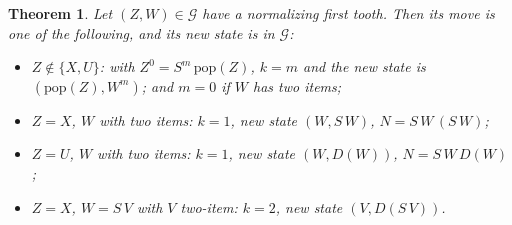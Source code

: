 \documentclass[11pt]{amsart}
\newtheorem{theorem}{Theorem}
\theoremstyle{definition}
\newcommand{\pop}{\mathrm{pop}}
\newcommand{\Gc}{\mathcal G}
\begin{document}
\begin{theorem}\label{thm:closure}
Let $(Z,W)\in\Gc$ have a normalizing first tooth. Then its move is one of the following, and its
new state is in $\Gc$:
\begin{itemize}
\item[(i)] $Z\notin\{X,U\}$: with $Z^0=S^m\,\pop(Z)$, $k=m$ and the new state is
  $(\pop(Z),W^m)$; and $m=0$ if $W$ has two items;
\item[(ii)] $Z=X$, $W$ with two items: $k=1$, new state $(W,S\,W)$, $N=S\,W\,(S\,W)$;
\item[(iii)] $Z=U$, $W$ with two items: $k=1$, new state $(W,D(W))$, $N=S\,W\,D(W)$;
\item[(iv)] $Z=X$, $W=S\,V$ with $V$ two-item: $k=2$, new state $(V,D(S\,V))$.
\end{itemize}
\end{theorem}
\end{document}
